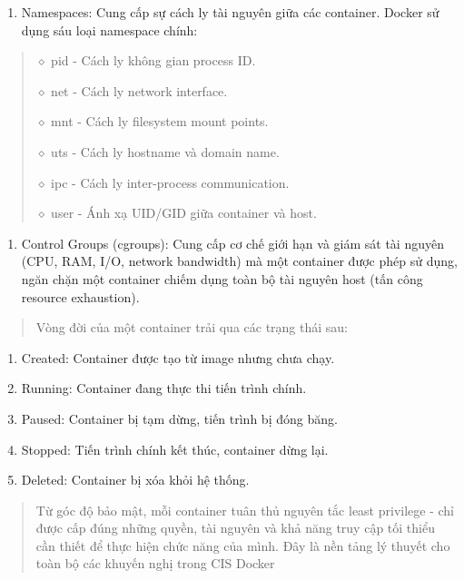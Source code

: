 \begin{enumerate}
\def\labelenumi{(\arabic{enumi})}
\item
  Namespaces: Cung cấp sự cách ly tài nguyên giữa các container. Docker sử dụng sáu loại namespace chính:
\end{enumerate}

\begin{quote}
\(\diamond\) pid - Cách ly không gian process ID.

\(\diamond\) net - Cách ly network interface.

\(\diamond\) mnt - Cách ly filesystem mount points.

\(\diamond\) uts - Cách ly hostname và domain name.

\(\diamond\) ipc - Cách ly inter-process communication.

\(\diamond\) user - Ánh xạ UID/GID giữa container và host.
\end{quote}

\begin{enumerate}
\def\labelenumi{(\arabic{enumi})}
\setcounter{enumi}{1}
\item
  Control Groups (cgroups): Cung cấp cơ chế giới hạn và giám sát tài nguyên (CPU, RAM, I/O, network bandwidth) mà một container được phép sử dụng, ngăn chặn một container chiếm dụng toàn bộ tài nguyên host (tấn công resource exhaustion).
\end{enumerate}

\begin{quote}
Vòng đời của một container trải qua các trạng thái sau:
\end{quote}

\begin{enumerate}
\def\labelenumi{\arabic{enumi}.}
\item
  Created: Container được tạo từ image nhưng chưa chạy.
\item
  Running: Container đang thực thi tiến trình chính.
\item
  Paused: Container bị tạm dừng, tiến trình bị đóng băng.
\item
  Stopped: Tiến trình chính kết thúc, container dừng lại.
\item
  Deleted: Container bị xóa khỏi hệ thống.
\end{enumerate}

\begin{quote}
Từ góc độ bảo mật, mỗi container tuân thủ nguyên tắc least privilege - chỉ được cấp đúng những quyền, tài nguyên và khả năng truy cập tối thiểu cần thiết để thực hiện chức năng của mình. Đây là nền tảng lý thuyết cho toàn bộ các khuyến nghị trong CIS Docker
\end{quote}

